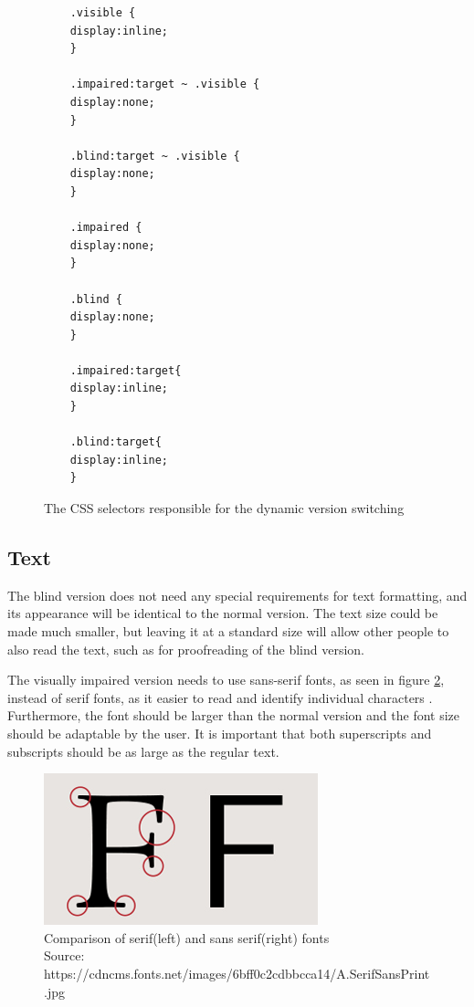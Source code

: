 \begin{figure}
	
	\begin{lstlisting}
	.visible {
	display:inline; 
	}
	
	.impaired:target ~ .visible {
	display:none; 
	}
	
	.blind:target ~ .visible {
	display:none; 
	}
	
	.impaired {
	display:none; 
	}
	
	.blind {
	display:none; 
	}
	
	.impaired:target{
	display:inline; 
	}
	
	.blind:target{
	display:inline; 
	}
	\end{lstlisting}
	\caption{The CSS selectors responsible for the dynamic version switching}
	\label{fig:css_selector}
\end{figure}

\subsection{Text}

The blind version does not need any special requirements for text formatting, and its appearance will be identical to the normal version. The text size could be made much smaller, but leaving it at a standard size will allow other people to also read the text, such as for proofreading of the blind version.

The visually impaired version needs to use sans-serif fonts, as seen in figure \ref{fig:sansSerif}, instead of serif fonts, as it easier to read and identify individual characters \cite{pdfBarrierefrei}. Furthermore, the font should be larger than the normal version and the font size should be adaptable by the user. It is important that both superscripts and subscripts should be as large as the regular text.

\begin{figure}
	
	\begin{center}
		\includegraphics[width=\linewidth/2]{figures/sansSerif.jpg}
	\end{center}

	
	\caption{Comparison of serif(left) and sans serif(right) fonts
		\\Source: https://cdncms.fonts.net/images/6bff0c2cdbbcca14/A.SerifSansPrint.jpg}
	\label{fig:sansSerif}
\end{figure}

